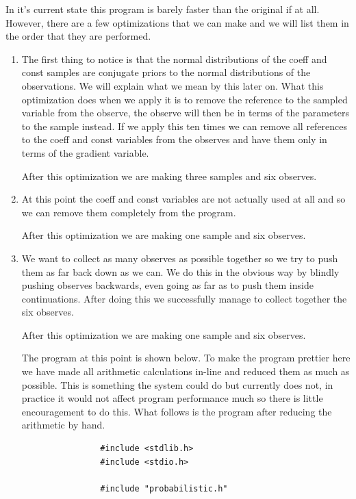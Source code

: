 \documentclass[a4paper]{article}
\begin{document}
In it's current state this program is barely faster than the original if at all. However, there are a few optimizations that we can make and we will list them in the order that they are performed.
\begin{enumerate}
\item
	The first thing to notice is that the normal distributions of the coeff and const samples are conjugate priors to the normal distributions of the observations. We will explain what we mean by this later on. What this optimization does when we apply it is to remove the reference to the sampled variable from the observe, the observe will then be in terms of the parameters to the sample instead. If we apply this ten times we can remove all references to the coeff and const variables from the observes and have them only in terms of the gradient variable.

	After this optimization we are making three samples and six observes.

\item
	At this point the coeff and const variables are not actually used at all and so we can remove them completely from the program.

	After this optimization we are making one sample and six observes.

\item
	We want to collect as many observes as possible together so we try to push them as far back down as we can. We do this in the obvious way by blindly pushing observes backwards, even going as far as to push them inside continuations. After doing this we successfully manage to collect together the six observes.

	After this optimization we are making one sample and six observes.

	The program at this point is shown below. To make the program prettier here we have made all arithmetic calculations in-line and reduced them as much as possible. This is something the system could do but currently does not, in practice it would not affect program performance much so there is little encouragement to do this. What follows is the program after reducing the arithmetic by hand.

	\begin{center}
		\begin{varwidth}{\linewidth}
			\small
			\begin{verbatim}
				#include <stdlib.h>
				#include <stdio.h>

				#include "probabilistic.h"


\end{verbatim}
\end{varwidth}
\end{center}
\end{enumerate}
\end{document}
